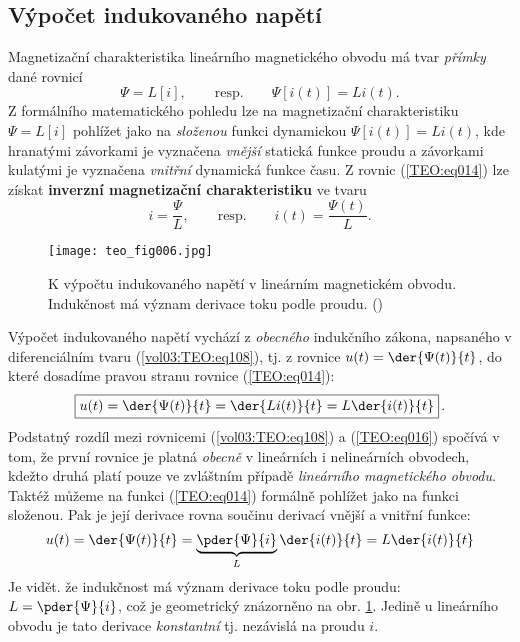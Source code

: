     \subsection{Výpočet indukovaného napětí}
      Magnetizační charakteristika lineárního magnetického obvodu má tvar \emph{přímky} dané rovnicí
      \begin{equation}\label{TEO:eq014}
        \Psi = L[i], \qquad\text{resp.}\qquad \Psi[i(t)] = Li(t).
      \end{equation}
      Z formálního matematického pohledu lze na magnetizační charakteristiku \(\Psi = L[i]\) 
      pohlížet jako na \emph{složenou} funkci dynamickou \(\Psi[i(t)] = Li(t)\), kde hranatými 
      závorkami je vyznačena \emph{vnější} statická funkce proudu a závorkami kulatými je vyznačena 
      \emph{vnitřní} dynamická funkce času. Z rovnic (\ref{TEO:eq014}) lze získat \textbf{inverzní 
      magnetizační charakteristiku} ve tvaru
      \begin{equation}\label{TEO:eq015}
        i = \frac{\Psi}{L}, \qquad\text{resp.}\qquad i(t) = \frac{\Psi(t)}{L}.
      \end{equation}
      
      \begin{figure}[ht!]  %
        \centering
        \texttt{[image: teo\_fig006.jpg]}
        \caption{K výpočtu indukovaného napětí v lineárním magnetickém obvodu. Indukčnost má význam 
                 derivace toku podle proudu.
                (\cite[s.~154]{Patocka4})}
        \label{teo:fig006}
      \end{figure}
      Výpočet indukovaného napětí vychází z \emph{obecného} indukčního zákona, napsaného v 
      diferenciálním tvaru (\ref{vol03:TEO:eq108}), tj. z rovnice \(u(t) = \der{\Psi(t)}{t}\), do 
      které dosadíme pravou stranu rovnice (\ref{TEO:eq014}):
      \begin{equation}\label{TEO:eq016}
        \boxed{u(t) = \der{\Psi(t)}{t} = \der{Li(t)}{t} = L\der{i(t)}{t}}\,.
      \end{equation}
      Podstatný rozdíl mezi rovnicemi (\ref{vol03:TEO:eq108}) a (\ref{TEO:eq016}) spočívá v tom, 
      že první rovnice je platná \emph{obecně} v lineárních i nelineárních obvodech, kdežto druhá 
      platí pouze ve zvláštním případě \emph{lineárního magnetického obvodu}. Taktéž můžeme na 
      funkci (\ref{TEO:eq014}) formálně pohlížet jako na funkci složenou. Pak je její derivace 
      rovna součinu derivací vnější a vnitřní funkce:
      \begin{equation}\label{TEO:eq017}
        u(t) = \der{\Psi(t)}{t} = \underbrace{\pder{\Psi}{i}}_L\der{i(t)}{t} = L\der{i(t)}{t}
      \end{equation}
      Je vidět. že indukčnost má význam derivace toku podle proudu: \(L = \pder{\Psi}{i}\), což je 
      geometrický znázorněno na obr. \ref{teo:fig006}. Jedině u lineárního obvodu je tato derivace 
      \emph{konstantní} tj. nezávislá na proudu \(i\).
      
